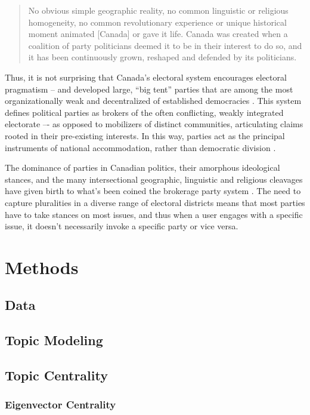 \documentclass{nws}
\begin{document}
\begin{quote}
  No obvious simple geographic reality, no common linguistic or religious
  homogeneity, no common revolutionary experience or unique historical moment
  animated [Canada] or gave it life. Canada was created when a coalition of party
  politicians deemed it to be in their interest to do so, and it has been
  continuously grown, reshaped and defended by its politicians.\cite{carty2010political}
\end{quote}
  Thus, it is not surprising that Canada’s electoral system
encourages electoral pragmatism – and developed large, “big tent” parties that
are among the most organizationally weak and decentralized of established
democracies \cite{carty2010political}. This system defines political parties as brokers of the often
conflicting, weakly integrated electorate –- as opposed to mobilizers of
distinct communities, articulating claims rooted in their pre-existing
interests. In this way, parties act as the principal instruments of national
accommodation, rather than democratic division \cite{carty2010political}.


The dominance of parties in Canadian politics, their amorphous ideological
stances, and the many intersectional geographic, linguistic and religious
cleavages have given birth to what’s been coined the brokerage party system
\cite{carty2010political}. The need to capture pluralities in a diverse range of
electoral districts means that most parties have to take stances on most issues,
and thus when a user engages with a specific issue, it doesn’t necessarily
invoke a specific party or vice versa. 


\section{Methods}

\subsection{Data}

\subsection{Topic Modeling}

\subsection{Topic Centrality}

\subsubsection{Eigenvector Centrality}
\end{document}
